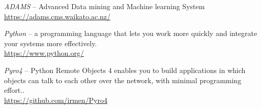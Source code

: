 %

\begin{thebibliography}{999}

		\textit{ADAMS} -- Advanced Data mining and Machine learning System \\
		\url{https://adams.cms.waikato.ac.nz/}{}

		\textit{Python} --  a programming language that lets you work more 
                quickly and integrate your systems more effectively. \\
		\url{https://www.python.org/}{}

		\textit{Pyro4} -- Python Remote Objects 4 enables you to build
		applications in which objects can talk to each other over the
		network, with minimal programming effort.. \\
		\url{https://github.com/irmen/Pyro4}{}

\end{thebibliography}
